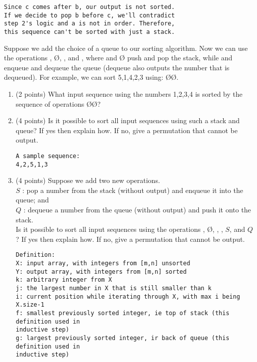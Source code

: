 \documentclass[11pt,table]{article}
\newcommand{\filledblank}[1]{\filledblankmath{#1}}
\newcommand{\filledblankmath}[1]{\begingroup\setlength{\fboxsep}{1em}\setlength{\fboxrule}{2pt}\fbox{\LARGE{#1}}\endgroup}
\newcommand{\filledSblank}[1]{\filledSblankmath{#1}}
\newcommand{\filledSblankmath}[1]{\begingroup\setlength{\fboxsep}{1em}\setlength{\fboxrule}{2pt}\fbox{#1}\endgroup}
\begin{document}
\begin{enumerate}
\begin{enumerate}
\begin{Verbatim}
Since c comes after b, our output is not sorted. 
If we decide to pop b before c, we'll contradict 
step 2's logic and a is not in order. Therefore, 
this sequence can't be sorted with just a stack.
\end{Verbatim}
\vspace{2.5in}
\end{enumerate}

Suppose we add the choice of a queue to our sorting algorithm.
Now we can use the operations \I, \O, \E, and \D{}, where \I{} and \O{} push and pop the stack, while \E{} and \D{} enqueue and dequeue the queue (dequeue also outputs the number that is dequeued).
For example,
we can sort 5,1,4,2,3 using:
\I\E\I\E\E\D\D\D\O\O.

\begin{enumerate}[resume]

\item (2 points)
What input sequence using the numbers 1,2,3,4 is sorted by the sequence of operations \E\I\E\I\O\O\D\D?

\filledSblank{3,2,4,1}

\item (4 points)
Is it possible to sort all input sequences using such a stack and queue?  If yes then explain how.
If no, give a permutation that cannot be output.

\hrulefill
\begin{Verbatim}
A sample sequence:
4,2,5,1,3

\end{Verbatim}
\vspace{0.2in}

\item (4 points)
Suppose we add two new operations.\\
$S$ : pop a number from the stack (without output) and enqueue it into the queue; and\\
$Q$ : dequeue a number from the queue (without output) and push it onto the stack.\\
Is it possible to sort all input sequences
using the operations \I, \O, \E, \D, $S$, and $Q$?  If yes then
explain how.  If no, give a permutation that cannot be output.

\hrulefill
\begin{Verbatim}
Definition:
X: input array, with integers from [m,n] unsorted
Y: output array, with integers from [m,n] sorted
k: arbitrary integer from X
j: the largest number in X that is still smaller than k
i: current position while iterating through X, with max i being X.size-1
f: smallest previously sorted integer, ie top of stack (this definition used in 
inductive step)
g: largest previously sorted integer, ir back of queue (this definition used in 
inductive step)


\end{Verbatim}
\end{enumerate}
\end{enumerate}
\end{document}
